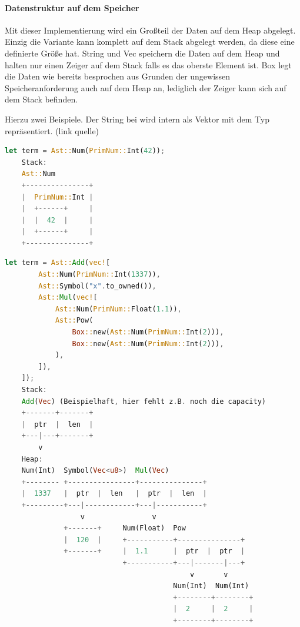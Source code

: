 \documentclass[11pt,a4paper, ngerman]{article}
\begin{document}
\paragraph{Datenstruktur auf dem Speicher} Mit dieser Implementierung wird ein Großteil der Daten auf dem Heap abgelegt. Einzig die Variante  kann komplett auf dem Stack abgelegt werden, da diese eine definierte Größe hat. String und Vec speichern die Daten auf dem Heap und halten nur einen Zeiger auf dem Stack falls es das oberste Element ist. Box legt die Daten wie bereits besprochen aus Grunden der ungewissen Speicheranforderung auch auf dem Heap an, lediglich der Zeiger kann sich auf dem Stack befinden.

Hierzu zwei Beispiele. Der String bei  wird intern als Vektor mit dem Typ  repräsentiert. (link quelle)
\begin{lstlisting}[language=rust, caption={Term 1 Stack und Heap}]
    let term = Ast::Num(PrimNum::Int(42));
    Stack:
    Ast::Num
    +---------------+
    |  PrimNum::Int |
    |  +------+     |
    |  |  42  |     |
    |  +------+     |
    +---------------+
\end{lstlisting}

\begin{lstlisting}[language=rust, caption={Term 2 Stack und Heap}]
    let term = Ast::Add(vec![
        Ast::Num(PrimNum::Int(1337)),
        Ast::Symbol("x".to_owned()),
        Ast::Mul(vec![
            Ast::Num(PrimNum::Float(1.1)),
            Ast::Pow(
                Box::new(Ast::Num(PrimNum::Int(2))),
                Box::new(Ast::Num(PrimNum::Int(2))),
            ),
        ]),
    ]);
    Stack:
    Add(Vec) (Beispielhaft, hier fehlt z.B. noch die capacity)
    +-------+-------+
    |  ptr  |  len  |
    +---|---+-------+
        v
    Heap:
    Num(Int)  Symbol(Vec<u8>)  Mul(Vec)
    +-------- +----------------+---------------+
    |  1337   |  ptr  |  len   |  ptr  |  len  |
    +---------+---|------------+---|-----------+
                  v                v
              +-------+     Num(Float)  Pow
              |  120  |     +-----------+---------------+
              +-------+     |  1.1      |  ptr  |  ptr  |
                            +-----------+---|-------|---+
                                            v       v
                                        Num(Int)  Num(Int)
                                        +--------+--------+
                                        |  2     |  2     |
                                        +--------+--------+
\end{lstlisting}
\end{document}
